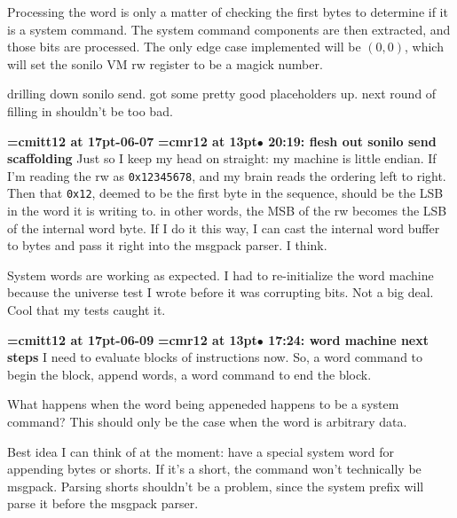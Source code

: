 Processing the word is only a matter of checking the first bytes to determine if it is a system command. The system command components are then extracted, and those bits are processed. The only edge case implemented will be $(0, 0)$, which will set the sonilo VM rw register to be a magick number.
\par

drilling down sonilo send. got some pretty good placeholders up. next round of filling in shouldn't be too bad.
\par

{\medskip\noindent\bf\font\titlefont=cmitt12 at 17pt-06-07}\medskip
{\smallskip\noindent\bf\font\titlefont=cmr12 at 13pt\titlefont $\bullet$ 20:19: flesh out sonilo send scaffolding}\smallskip
Just so I keep my head on straight: my machine is little endian. If I'm reading the rw as {\tt 0x12345678}, and my brain reads the ordering left to right. Then that {\tt 0x12}, deemed to be the first byte in the sequence, should be the LSB in the word it is writing to. in other words, the MSB of the rw becomes the LSB of the internal word byte. If I do it this way, I can cast the internal word buffer to bytes and pass it right into the msgpack parser. I think.
\par

System words are working as expected. I had to re-initialize the word machine because the universe test I wrote before it was corrupting bits. Not a big deal. Cool that my tests caught it.
\par

{\medskip\noindent\bf\font\titlefont=cmitt12 at 17pt-06-09}\medskip
{\smallskip\noindent\bf\font\titlefont=cmr12 at 13pt\titlefont $\bullet$ 17:24: word machine next steps}\smallskip
I need to evaluate blocks of instructions now. So, a word command to begin the block, append words, a word command to end the block.
\par

What happens when the word being appeneded happens to be a system command? This should only be the case when the word is arbitrary data.
\par

Best idea I can think of at the moment: have a special system word for appending bytes or shorts. If it's a short, the command won't technically be msgpack. Parsing shorts shouldn't be a problem, since the system prefix will parse it before the msgpack parser.
\par

